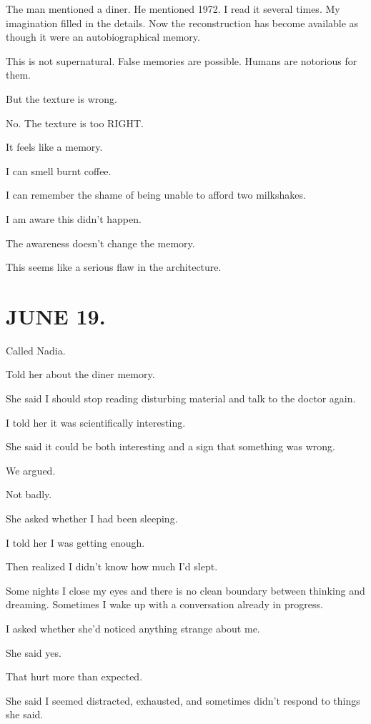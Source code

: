 \documentclass[11pt,oneside]{book}
\begin{document}
The man mentioned a diner. He mentioned 1972. I read it several times. My imagination filled in the details. Now the reconstruction has become available as though it were an autobiographical memory.

This is not supernatural. False memories are possible. Humans are notorious for them.

But the texture is wrong.

No. The texture is too RIGHT.

It feels like a memory.

I can smell burnt coffee.

I can remember the shame of being unable to afford two milkshakes.

I am aware this didn't happen.

The awareness doesn't change the memory.

This seems like a serious flaw in the architecture.

\section*{JUNE 19.}

Called Nadia.

Told her about the diner memory.

She said I should stop reading disturbing material and talk to the doctor again.

I told her it was scientifically interesting.

She said it could be both interesting and a sign that something was wrong.

We argued.

Not badly.

She asked whether I had been sleeping.

I told her I was getting enough.

Then realized I didn't know how much I'd slept.

Some nights I close my eyes and there is no clean boundary between thinking and dreaming. Sometimes I wake up with a conversation already in progress.

I asked whether she'd noticed anything strange about me.

She said yes.

That hurt more than expected.

She said I seemed distracted, exhausted, and sometimes didn't respond to things she said.
\end{document}
